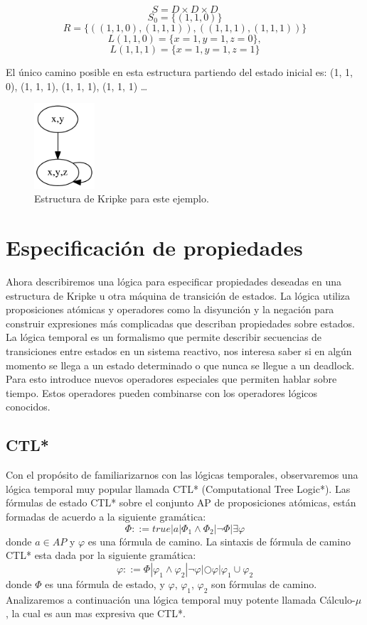 \[S = D \times D \times D\]
\[S_{0} = \{(1, 1, 0)\}\]
\[R = \{((1, 1, 0), (1, 1, 1)), ((1, 1, 1), (1, 1, 1))\}\]
\[L (1, 1, 0) = \{x = 1, y = 1, z = 0\},\]
\[L (1, 1, 1) = \{x = 1, y = 1, z = 1\}\]

El único camino posible en esta estructura partiendo del estado inicial es: (1, 1, 0), (1, 1, 1), (1, 1, 1), (1, 1, 1) …

\begin{figure}[h!]
  \centering
  \includegraphics[width=0.2\textwidth]{Figures/kripke.png}
  \caption{Estructura de Kripke para este ejemplo.}
  \label{fig:kripke1}
\end{figure}

\section{Especificación de propiedades}

Ahora describiremos una lógica para especificar propiedades deseadas en una estructura de Kripke u otra máquina de transición de estados. La lógica utiliza proposiciones atómicas y operadores como la disyunción y la negación para construir expresiones más complicadas que describan propiedades sobre estados.
La lógica temporal es un formalismo que permite describir secuencias de transiciones entre estados en un sistema reactivo, nos interesa saber si en algún momento se llega a un estado determinado o que nunca se llegue a un deadlock. Para esto introduce nuevos operadores especiales que permiten hablar sobre tiempo. Estos operadores pueden combinarse con los operadores lógicos conocidos.

\subsection{CTL*}

Con el propósito de familiarizarnos con las lógicas temporales, observaremos una lógica temporal muy popular llamada CTL* (Computational Tree Logic*).
Las fórmulas de estado CTL* sobre el conjunto AP de proposiciones atómicas, están formadas de acuerdo a la siguiente gramática\cite{Baier:2}:
\[\Phi ::= true | a | \Phi_{1} \land \Phi_{2} | \neg \Phi | \exists \varphi \]
donde $a \in AP$ y $\varphi$ es una fórmula de camino. La sintaxis de fórmula de camino CTL* esta dada por la siguiente gramática:
\[\varphi ::= \Phi | \varphi_{1} \land \varphi_{2} | \neg \varphi | \bigcirc \varphi | \varphi_{1} \cup \varphi_{2} \]
donde $\Phi$ es una fórmula de estado, y $\varphi$, $\varphi_{1}$, $\varphi_{2}$ son fórmulas de camino.
Analizaremos a continuación una lógica temporal muy potente llamada Cálculo-$\mu$, la cual es aun mas expresiva que CTL*.


